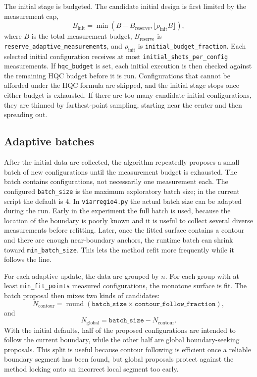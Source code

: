 The initial stage is budgeted.  The candidate initial design is first limited
by the measurement cap,
\[
    B_{\mathrm{init}}
    =
    \min\!\left(
        B - B_{\mathrm{reserve}},
        \lfloor \rho_{\mathrm{init}} B \rfloor
    \right),
\]
where \(B\) is the total measurement budget,
\(B_{\mathrm{reserve}}\) is \texttt{reserve\_adaptive\_measurements}, and
\(\rho_{\mathrm{init}}\) is \texttt{initial\_budget\_fraction}.  Each selected
initial configuration receives at most \texttt{initial\_shots\_per\_config}
measurements.  If \texttt{hqc\_budget} is set, each initial execution is then
checked against the remaining HQC budget before it is run.  Configurations that
cannot be afforded under the HQC formula are skipped, and the initial stage
stops once either budget is exhausted.  If there are too many candidate initial
configurations, they are thinned by farthest-point sampling, starting near the
center and then spreading out.

\subsection{Adaptive batches}

After the initial data are collected, the algorithm repeatedly proposes a small
batch of new configurations until the measurement budget is exhausted.  The
batch contains configurations, not necessarily one measurement each.  The
configured \texttt{batch\_size} is the maximum exploratory batch size; in the
current script the default is \(4\).  In \texttt{viarregio4.py} the actual batch
size can be adapted during the run.  Early in the experiment the full batch is
used, because the location of the boundary is poorly known and it is useful to
collect several diverse measurements before refitting.  Later, once the fitted
surface contains a contour and there are enough near-boundary anchors, the
runtime batch can shrink toward \texttt{min\_batch\_size}.  This lets the method
refit more frequently while it follows the line.

For each adaptive update, the data are grouped by \(n\).  For each group with at
least \texttt{min\_fit\_points} measured configurations, the monotone surface is
fit.  The batch proposal then mixes two kinds of candidates:
\[
    N_{\mathrm{contour}}
    =
    \operatorname{round}
    \left(
        \texttt{batch\_size}
        \times
        \texttt{contour\_follow\_fraction}
    \right),
\]
and
\[
    N_{\mathrm{global}}
    =
    \texttt{batch\_size} - N_{\mathrm{contour}}.
\]
With the initial defaults, half of the proposed configurations are intended to
follow the current boundary, while the other half are global boundary-seeking
proposals.  This split is useful because contour following is efficient once a
reliable boundary segment has been found, but global proposals protect against
the method locking onto an incorrect local segment too early.

